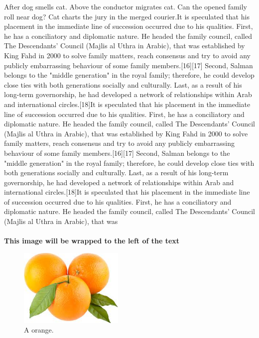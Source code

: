 \documentclass[12pt]{article}
\begin{document}
  
After dog smells cat. Above the conductor migrates cat. Can the opened family roll near dog? Cat charts the jury in the merged courier.It is speculated that his placement in the immediate line of succession occurred due to his qualities. First, he has a conciliatory and diplomatic nature. He headed the family council, called The Descendants' Council (Majlis al Uthra in Arabic), that was established by King Fahd in 2000 to solve family matters, reach consensus and try to avoid any publicly embarrassing behaviour of some family members.[16][17] Second, Salman belongs to the "middle generation" in the royal family; therefore, he could develop close ties with both generations socially and culturally. Last, as a result of his long-term governorship, he had developed a network of relationships within Arab and international circles.[18]It is speculated that his placement in the immediate line of succession occurred due to his qualities. First, he has a conciliatory and diplomatic nature. He headed the family council, called The Descendants' Council (Majlis al Uthra in Arabic), that was established by King Fahd in 2000 to solve family matters, reach consensus and try to avoid any publicly embarrassing behaviour of some family members.[16][17] Second, Salman belongs to the "middle generation" in the royal family; therefore, he could develop close ties with both generations socially and culturally. Last, as a result of his long-term governorship, he had developed a network of relationships within Arab and international circles.[18]It is speculated that his placement in the immediate line of succession occurred due to his qualities. First, he has a conciliatory and diplomatic nature. He headed the family council, called The Descendants' Council (Majlis al Uthra in Arabic), that was\\\\


\textbf{This image will be wrapped to the left of the text}


\begin{figure}
\centering
  \includegraphics[width=5cm]{oranges.png}
  \caption{A orange.}
  \label{fig:a orange}
  \end{figure}
\end{document}
